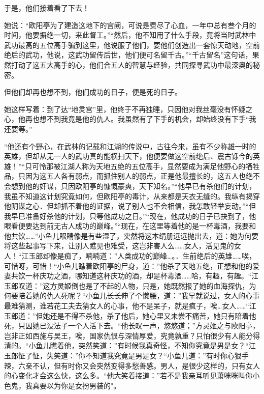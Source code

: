 \documentclass[12pt,oneside]{book}
\begin{document}
于是，他们接着看了下去！

她说：``欧阳亭为了建造这地下的宫阙，可说是费尽了心血，一年中总有叁个月的时间，他要摒绝一切，来此督工。''``然后，他不知用了什么手段，竟将当时武林中武功最高的五位高手骗到这里，他说服了他们，要他们创造出一套惊天动地，空前绝后的武功，他说，这武功留传后世，他们便可名留千古。''``千古留名''这句话，果然打动了这五大高手的心，他们合五人的智慧与经验，共同探寻武功中最深奥的秘密。

但他们却再也想不到，他们成功的日子，便是死的日子。

她这样写着：到了达``地灵宫''里，他终于不再独睡，只因他对我丝毫没有怀疑之心，他再也想不到我竟是他的仇人。我虽然有了下手的机会，却始终没有下手``我还要等。''

``他还有个野心，在武林的记载和江湖的传说中，古往今来，虽有不少称雄一时的英雄，但却从无一人的武功真的能横扫天下，他便要做这空前绝后、震古铄今的英雄！''``只可怜那被江湖人称为天地五绝的五位高手，显然要成为满足他野心的牺牲品，只因为这五人各有弱点，而抓住别人的弱点，正是他最擅长的，这五人也绝不会想到他的奸谋，只因欧阳亭的慷慨豪爽，天下知名。''``他早已有杀他们的计划，我虽不知道这计划究竟如何，但欧阳亭的毒计，从来都是天衣无缝的。我纵有揭穿他阴谋之心．但却抓不着他的证据，说了别人也不会相信，我怎敢轻举妄动。''``但我早巳准备好杀他的计划，只等他成功之日。''``现在，他成功的日子已抉到了，他眼看便要达到前无古人成功的巅峰。''``现在，在这里等着他的是一杯毒酒，我要和他共饮\ldots\ldots{}''小鱼儿眼睛像是有些湿了，突然将这本绢册远远抛出去，道：她为何要将这些起事写下来，让别人瞧见也难受，这岂非害人么\ldots\ldots 女人，活见鬼的女人！``江玉郎却像是痴了，喃喃道：''人类成功的巅峰\ldots。．生前绝后的英雄\ldots\ldots 唉，可惜呀，可惜！``小鱼儿瞧着欧阳亭的尸身，道：''他杀了天地五绝，正想和他的爱妻共饮一杯庆功之酒，哪知道这杯庆功的酒，却是杯毒酒\ldots\ldots 哈，有趣，有趣。``江玉郎叹道：''这方灵姬倒也是了不起的人物，只是，她既然报了她的血海探仇，为何要陪着她的仇人死呢？``小鱼儿长长伸了个懒腰，道：''我早就说过，女人的心事最难猜测，谁若花工夫去猜女人的心事，他不是呆子，就是疯子，唉\ldots 女人\ldots\ldots{}``江玉郎道：''但她还是不得不杀他，杀了他后，她心里又未尝不痛苦，她只有陪着他死，只因她已没法子一个人活下去。``他长叹一声，悠悠道；''方灵姬之与欧阳亭，岂非正如西施与吴王，唉，国家仇恨与深情厚爱，究竟孰重？只怕很少有人能分得清的。``小鱼儿瞧着他，突然笑道：''有时候我真奇怪，不知你究竟是男是女？``江玉郎怔了怔，失笑道：''你不知道我究竟是男是女？``小鱼儿道：''有时你心狠手辣，六亲不认，但有时你又会突然变得多愁善感。男人，是很少这样的，只有女人的心变化才会这么快，这么多。``他大笑着接道：''若不是我亲耳听见萧咪咪叫你小色鬼，我真要以为你是女扮男装的"。
\end{document}
